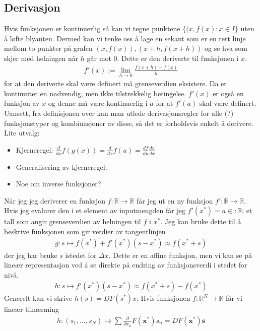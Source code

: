 \subsection{Derivasjon}
Hvis funksjonen er kontinuerlig så kan vi tegne punktene $\{(x,f(x):x\in I\}$ uten å løfte blyanten. Dermed kan vi tenke oss å lage en sekant som er en rett linje mellom to punkter på grafen $(x,f(x)),(x+h,f(x+h))$ og se hva som skjer med helningen når $h$ går mot $0$. Dette er den deriverte til funksjonen i $x$.
\begin{align}
f'(x) := \lim_{h\to0}\frac{f(x+h)-f(x)}{h}
\end{align}
for at den deriverte skal være definert må grenseverdien eksistere. Da er kontinuitet en nødvendig, men ikke tilstrekkelig betingelse. $f'(x)$ er også en funksjon av $x$ og denne må være kontinuerlig i $a$ for at $f'(a)$ skal være definert. Uansett, fra definisjonen over kan man utlede derivasjonsregler for alle (?) funksjonstyper og kombinasjoner av disse, så det er forholdsvis enkelt å derivere. Lite utvalg:
\begin{itemize}
\item Kjerneregel: $\frac{d}{dx}f(g(x)) = \frac{d}{dx}f(u) = \frac{df}{du}\frac{du}{dx}$
\item Generalisering av kjerneregel:
\item Noe om inverse funksjoner?
\end{itemize}
Når jeg jeg deriverer en funksjon $f:\mathbb{R} \to \mathbb{R}$ får jeg ut en ny funksjon $f':\mathbb{R} \to \mathbb{R}$. Hvis jeg evalurer den i et element av inputmengden får jeg $f'(x^*) = a \in :\mathbb{R}$; et tall som angir grenseverdien av helningen til $f$ i $x^*$. Jeg kan bruke dette til å beskrive funksjonen som gir verdier av tangentlinjen
\begin{align}
g:s\mapsto f(x^*)+ f'(x^*)(s-x^*) \approx f(x^*+s)
\end{align}
der jeg har bruke $s$ istedet for $\Delta x$. Dette er en affine funksjon, men vi kan se på lineær representasjon ved å se direkte på endring av funksjonsverdi i stedet for nivå.
\begin{align}
h:s\mapsto f'(x^*)(s-x^*) \approx f(x^*+s)-f(x^*) 
\end{align}
Generelt kan vi skrive $h(s)=DF(s^*)x$. Hvis funksjonen $f:\mathbb{R}^N\to\mathbb{R}$ får vi lineær tilnærming
\begin{align}
h:(s_1,...,s_N) \mapsto \sum \frac{\partial}{\partial x_n}F(\mathbf{x}^*)s_n = DF(\mathbf{x}^*)\mathbf{s}
\end{align}
